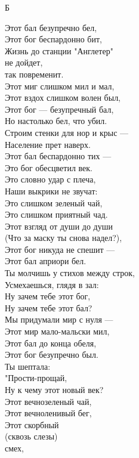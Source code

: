 \begin{poem}{Б}{~}
	\begin{altverse}
	Этот бал безупречно бел,\\
	Этот бог беспардонно бит,\\
	Жизнь до станции "Англетер"\\
	не дойдет,\\
	так повременит.\\
	Этот миг слишком мил и мал,\\
	Этот вздох слишком волен был,\\
	Этот бог --- безупречный бал,\\
	Но настолько бел, что убил.\\
	Строим стенки для нор и крыс ---\\
	Население прет наверх.\\
	Этот бал беспардонно тих ---\\
	Это бог обесцветил век.\\
	Это словно удар с плеча,\\
	Наши выкрики не звучат:\\
	Это слишком зеленый чай,\\
	Это слишком приятный чад.\\
	Этот взгляд от души до души\\
	(Что за маску ты снова надел?),\\
	Этот бог никуда не спешит ---\\
	Этот бал априори бел.\\
	Ты молчишь у стихов между строк,\\
	Усмехаешься, глядя в зал:\\
	Ну зачем тебе этот бог,\\
	Ну зачем тебе этот бал?\\
	Мы придумали мир с нуля ---\\
	Этот мир мало-мальски мил,\\
	Этот бал до конца обеля,\\
	Этот бог безупречно был.\\
	Ты шептала:\\
	"Прости-прощай,\\
	Ну к чему этот новый век?\\
	Этот вечнозеленый чай,\\
	Этот вечноленивый бег,\\
	Этот скорбный \\
	(сквозь слезы)\\
	смех,\\

\end{altverse}
\end{poem}

